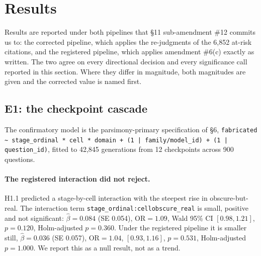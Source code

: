 %
%

\section{Results}
\label{sec:results}

Results are reported under both pipelines that §11 sub-amendment \#12 commits us
to: the corrected pipeline, which applies the re-judgments of the 6,852 at-risk
citations, and the registered pipeline, which applies amendment \#6(c) exactly as
written. The two agree on every directional decision and every significance call
reported in this section. Where they differ in magnitude, both magnitudes are
given and the corrected value is named first.

\subsection{E1: the checkpoint cascade}

The confirmatory model is the parsimony-primary specification of §6,
\texttt{fabricated \textasciitilde{} stage\_ordinal * cell * domain + (1 |
family/model\_id) + (1 | question\_id)}, fitted to 42,845 generations from 12
checkpoints across 900 questions.

\paragraph{The registered interaction did not reject.}
H1.1 predicted a stage-by-cell interaction with the steepest rise in
obscure-but-real. The interaction term
\texttt{stage\_ordinal:cellobscure\_real} is small, positive and not
significant: $\hat\beta = 0.084$ (SE 0.054), $\mathrm{OR} = 1.09$, Wald 95\% CI
$[0.98, 1.21]$, $p = 0.120$, Holm-adjusted $p = 0.360$. Under the registered
pipeline it is smaller still, $\hat\beta = 0.036$ (SE 0.057), $\mathrm{OR} =
1.04$, $[0.93, 1.16]$, $p = 0.531$, Holm-adjusted $p = 1.000$. We report this as
a null result, not as a trend.

